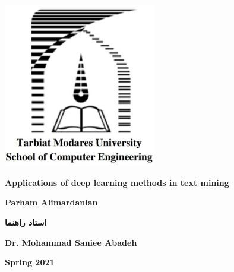 \documentclass[12pt, a4paper, oneside]{report}
\begin{document}
\begin{latin}

\begin{center}

\includegraphics[width=0.5\textwidth]{tarbiat-en.jpg}
\vspace{1.5cm}

\LARGE
\textbf{Applications of deep learning methods in text mining}
\vspace{1cm}

\Large
\textbf{Parham Alimardanian}
\vspace{1.5cm}

\large
\textbf{استاد راهنما}

\textbf{Dr. Mohammad Saniee Abadeh}
\vspace{3cm}

\large
\textbf{Spring 2021}


\end{center}

\end{latin}
\end{document}

